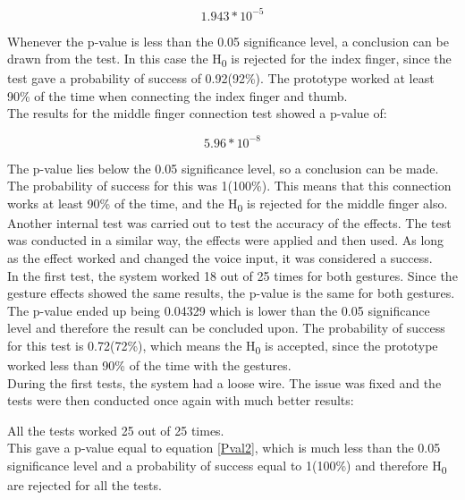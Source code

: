 \begin{equation}
	1.943*10^{-5}
\end{equation} 

Whenever the p-value is less than the 0.05 significance level, a conclusion can be drawn from the test. In this case the H\textsubscript{0} is rejected for the index finger, since the test gave a probability of success of 0.92(92\%).
The prototype worked at least 90\% of the time when connecting the index finger and thumb. \\

The results for the middle finger connection test showed a p-value of:

\begin{equation}\label{Pval2}
	5.96*10^{-8}
\end{equation} 

The p-value lies below the 0.05 significance level, so a conclusion can be made. The probability of success for this was 1(100\%). This means that this connection works at least 90\% of the time, and the H\textsubscript{0} is rejected for the middle finger also. \\

Another internal test was carried out to test the accuracy of the effects. The test was conducted in a similar way, the effects were applied and then used. 
As long as the effect worked and changed the voice input, it was considered a success. \\

In the first test, the system worked 18 out of 25 times for both gestures.
Since the gesture effects showed the same results, the p-value is the same for both gestures. 
The p-value ended up being 0.04329 which is lower than the 0.05 significance level and therefore the result can be concluded upon. The probability of success for this test is 0.72(72\%), which means the H\textsubscript{0} is accepted, since the prototype worked less than 90\% of the time with the gestures. \\

During the first tests, the system had a loose wire. The issue was fixed and the tests were then conducted once again with much better results:

All the tests worked 25 out of 25 times. \\

This gave a p-value equal to equation \ref{Pval2}, which is much less than the 0.05 significance level and a probability of success equal to 1(100\%) and therefore H\textsubscript{0} are rejected for all the tests.

